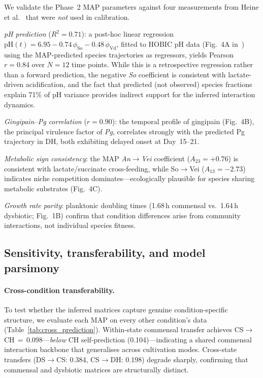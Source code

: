 \documentclass[11pt,a4paper]{article}
\begin{document}
We validate the Phase~2 MAP parameters against four measurements from Heine et al.~\cite{Heine2025PeriImplant} that were \emph{not} used in calibration.

\textit{pH prediction} ($R^2=0.71$):
a post-hoc linear regression $\mathrm{pH}(t) = 6.95 - 0.74\,\phi_{\mathrm{So}} - 0.48\,\phi_{\mathrm{Vd}}$, fitted to HOBIC pH data (Fig.~4A in~\cite{Heine2025PeriImplant}) using the MAP-predicted species trajectories as regressors, yields Pearson $r=0.84$ over $N=12$ time points.
While this is a retrospective regression rather than a forward prediction, the negative \textit{So} coefficient is consistent with lactate-driven acidification, and the fact that predicted (not observed) species fractions explain 71\% of pH variance provides indirect support for the inferred interaction dynamics.

\textit{Gingipain--\textit{Pg} correlation} ($r=0.90$):
the temporal profile of gingipain (Fig.~4B), the principal virulence factor of \textit{Pg}, correlates strongly with the predicted Pg trajectory in DH, both exhibiting delayed onset at Day~15--21.

\textit{Metabolic sign consistency}:
the MAP \textit{An}$\to$\textit{Vei} coefficient ($A_{23}=+0.76$) is consistent with lactate/succinate cross-feeding, while So$\to$Vei ($A_{13}=-2.73$) indicates niche competition dominates---ecologically plausible for species sharing metabolic substrates (Fig.~4C).

\textit{Growth rate parity}:
planktonic doubling times (1.68\,h commensal vs.\ 1.64\,h dysbiotic; Fig.~1B) confirm that condition differences arise from community interactions, not individual species fitness.

\subsection{Sensitivity, transferability, and model parsimony}
\label{sec:sensitivity}

\paragraph{Cross-condition transferability.}
To test whether the inferred matrices capture genuine condition-specific structure, we evaluate each MAP on every other condition's data (Table~\ref{tab:cross_prediction}).
Within-state commensal transfer achieves CS$\to$CH\,$=$\,0.098---\emph{below} CH self-prediction (0.104)---indicating a shared commensal interaction backbone that generalises across cultivation modes.
Cross-state transfers (DS$\to$CS: 0.384, CS$\to$DH: 0.198) degrade sharply, confirming that commensal and dysbiotic matrices are structurally distinct.
\end{document}

